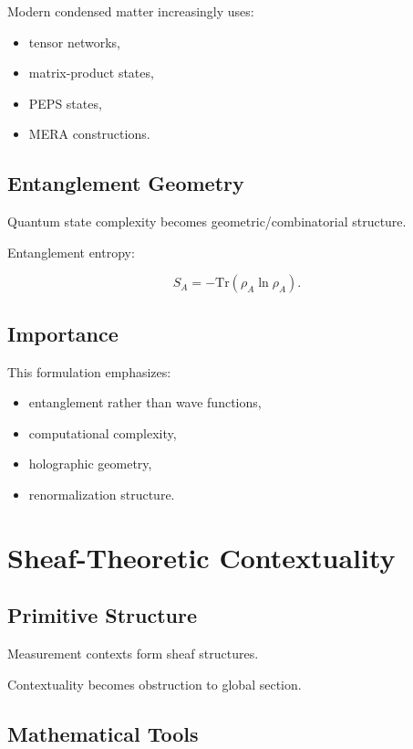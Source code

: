 \documentclass[11pt]{article}
\begin{document}
Modern condensed matter increasingly uses:

\begin{itemize}
\item tensor networks,
\item matrix-product states,
\item PEPS states,
\item MERA constructions.
\end{itemize}

\subsection{Entanglement Geometry}

Quantum state complexity becomes geometric/combinatorial structure.

Entanglement entropy:

\[
S_A
=
-\mathrm{Tr}
(\rho_A \ln \rho_A).
\]

\subsection{Importance}

This formulation emphasizes:

\begin{itemize}
\item entanglement rather than wave functions,
\item computational complexity,
\item holographic geometry,
\item renormalization structure.
\end{itemize}

\section{Sheaf-Theoretic Contextuality}

\subsection{Primitive Structure}

Measurement contexts form sheaf structures.

Contextuality becomes obstruction to global section.

\subsection{Mathematical Tools}
\end{document}
